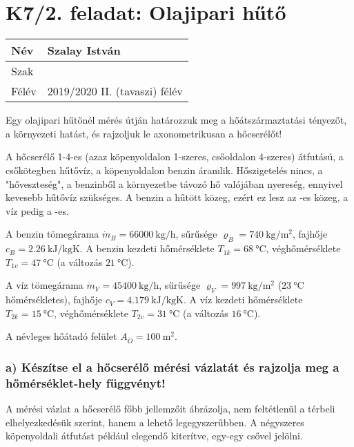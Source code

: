 

\section*{K7/2. feladat: Olajipari hűtő}

\begin{tabular}{ | p{2cm} | p{14cm} | } 
	\hline
	Név & Szalay István \\ 
	\hline
	Szak & \\ 
	\hline
	Félév & 2019/2020 II. (tavaszi) félév \\ 
	\hline
\end{tabular}
\vspace{0.5cm}

\noindent Egy olajipari hűtőnél mérés útján határozzuk meg a hőátszármaztatási tényezőt, a környezeti hatást, és rajzoljuk le axonometrikusan a hőcserélőt!

A hőcserélő 1-4-es (azaz köpenyoldalon 1-szeres, csőoldalon 4-szeres) átfutású, a csőkötegben hűtővíz, a köpenyoldalon benzin  áramlik. Hőszigetelés nincs, a "hőveszteség", a benzinből a környezetbe távozó hő valójában nyereség, ennyivel kevesebb hűtővíz szükséges. A benzin a hűtött közeg, ezért ez lesz az -es közeg, a víz pedig a -es.

A benzin tömegárama $\dot{m}_B = \SI{66000}{\kilogram\per\hour}$, sűrűsége $\varrho_B = \SI{740}{\kilogram\per\meter\squared}$, fajhője $c_B = \SI{2.26}{\kilo\joule\per\kilogram\kelvin}$. A benzin kezdeti hőmérséklete $T_{1k} = \SI{68}{\celsius}$, véghőmérséklete $T_{1v} = \SI{47}{\celsius}$ (a változás $\SI{21}{\celsius}$).

A víz tömegárama $\dot{m}_V = \SI{45400}{\kilogram\per\hour}$, sűrűsége $\varrho_V = \SI{997}{\kilogram\per\meter\squared}$ ($\SI{23}{\celsius}$ hőmérsékletes), fajhője $c_V = \SI{4.179}{\kilo\joule\per\kilogram\kelvin}$. A víz kezdeti hőmérséklete $T_{2k} = \SI{15}{\celsius}$, véghőmérséklete $T_{2v} = \SI{31}{\celsius}$ (a változás $\SI{16}{\celsius}$).

A névleges hőátadó felület $A_{\ddot{O}} = \SI{100}{\meter\squared}$.

\subsubsection*{a) Készítse el a hőcserélő mérési vázlatát és rajzolja meg a hőmérséklet-hely függvényt!}
A mérési vázlat a hőcserélő főbb jellemzőit ábrázolja, nem feltétlenül a térbeli elhelyezkedésük szerint, hanem a lehető legegyszerűbben. A négyszeres köpenyoldali átfutást például elegendő kiterítve, egy-egy csővel jelölni.

